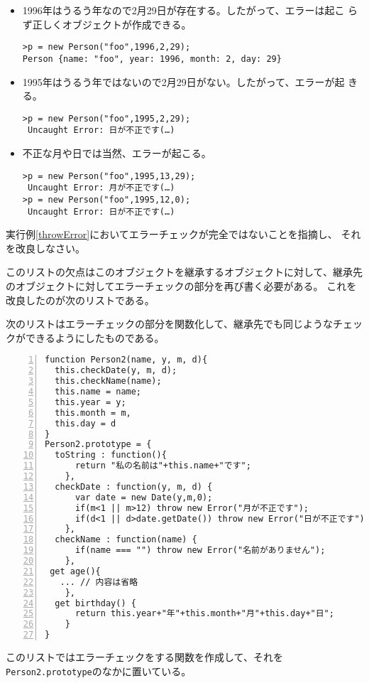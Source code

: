 \begin{Exec}
\begin{itemize}
\begin{Verbatim}
\end{Verbatim}
 \item 1996年はうるう年なので2月29日が存在する。したがって、エラーは起こ
			 らず正しくオブジェクトが作成できる。
\begin{Verbatim}
>p = new Person("foo",1996,2,29);
Person {name: "foo", year: 1996, month: 2, day: 29}
\end{Verbatim}
 \item 1995年はうるう年ではないので2月29日がない。したがって、エラーが起
			 きる。
\begin{Verbatim}
>p = new Person("foo",1995,2,29);
 Uncaught Error: 日が不正です(…)
\end{Verbatim}
 \item 不正な月や日では当然、エラーが起こる。
\begin{Verbatim}
>p = new Person("foo",1995,13,29);
 Uncaught Error: 月が不正です(…)
>p = new Person("foo",1995,12,0);
 Uncaught Error: 日が不正です(…)
\end{Verbatim}
\end{itemize}
\begin{Prob}\upshape\label{CorrectErrorCheck}
 実行例\ref{throwError}においてエラーチェックが完全ではないことを指摘し、
 それを改良しなさい。
\end{Prob}
このリストの欠点はこのオブジェクトを継承するオブジェクトに対して、継承先
のオブジェクトに対してエラーチェックの部分を再び書く必要がある。
これを改良したのが次のリストである。
\begin{Exec}\upshape\label{Error2}
次のリストはエラーチェックの部分を関数化して、継承先でも同じようなチェッ
 クができるようにしたものである。
\begin{Verbatim}[numbers=left]
function Person2(name, y, m, d){
  this.checkDate(y, m, d);
  this.checkName(name);
  this.name = name;
  this.year = y;
  this.month = m,
  this.day = d
}
Person2.prototype = {
  toString : function(){
      return "私の名前は"+this.name+"です";
    },
  checkDate : function(y, m, d) {
      var date = new Date(y,m,0);
      if(m<1 || m>12) throw new Error("月が不正です");
      if(d<1 || d>date.getDate()) throw new Error("日が不正です");
    },
  checkName : function(name) {
      if(name === "") throw new Error("名前がありません");
    },
 get age(){
   ... // 内容は省略
    },
  get birthday() {
      return this.year+"年"+this.month+"月"+this.day+"日";
    }
}
\end{Verbatim}
 \end{Exec}
このリストではエラーチェックをする関数を作成して、それを
 \texttt{Person2.prototype}のなかに置いている。

\end{Exec}
